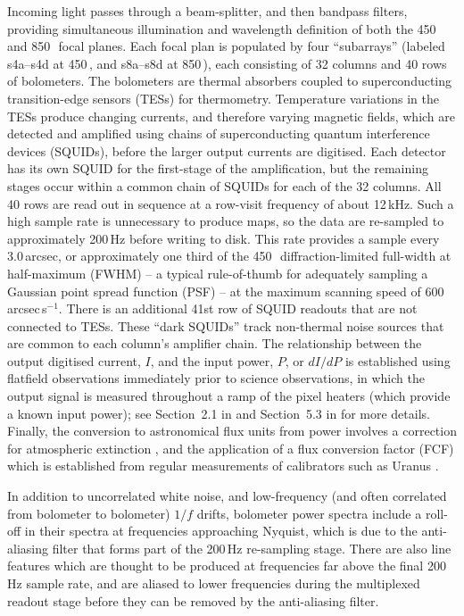 \documentclass[useAMS,usenatbib,nofootinbib]{mn2e}
\begin{document}
Incoming light passes through a beam-splitter, and then bandpass
filters, providing simultaneous illumination and wavelength definition
of both the 450 and 850\,\micron\ focal planes. Each focal plan is
populated by four ``subarrays'' (labeled s4a--s4d at 450\,\micron, and
s8a--s8d at 850\,\micron), each consisting of 32 columns and 40 rows
of bolometers. The bolometers are thermal absorbers coupled to
superconducting transition-edge sensors (TESs) for thermometry.
Temperature variations in the TESs produce changing currents, and
therefore varying magnetic fields, which are detected and amplified
using chains of superconducting quantum interference devices (SQUIDs),
before the larger output currents are digitised. Each detector has its
own SQUID for the first-stage of the amplification, but the remaining
stages occur within a common chain of SQUIDs for each of the 32
columns. All 40 rows are read out in sequence at a row-visit frequency
of about 12\,kHz. Such a high sample rate is unnecessary to produce
maps, so the data are re-sampled to approximately 200\,Hz before
writing to disk. This rate provides a sample every 3.0\,arcsec, or
approximately one third of the 450\,\micron\ diffraction-limited
full-width at half-maximum (FWHM) -- a typical rule-of-thumb for
adequately sampling a Gaussian point spread function (PSF) -- at the
maximum scanning speed of 600\,arcsec\,s$^{-1}$. There is an
additional 41st row of SQUID readouts that are not connected to
TESs. These ``dark SQUIDs'' track non-thermal noise sources that are
common to each column's amplifier chain. The relationship between the
output digitised current, $I$, and the input power, $P$, or $dI/dP$ is
established using flatfield observations immediately prior to science
observations, in which the output signal is measured throughout a ramp
of the pixel heaters (which provide a known input power); see
Section~2.1 in \citet{dempsey2012} and Section~5.3 in
\citet{holland2012} for more details. Finally, the conversion to
astronomical flux units from power involves a correction for
atmospheric extinction \citep[primarily using the JCMT Water Vapour
Monitor to track line-of-sight opacity variations, see Section~3
in][]{dempsey2012}, and the application of a flux conversion factor
(FCF) which is established from regular measurements of calibrators
such as Uranus \citep[Section~5 in][]{dempsey2012}.

In addition to uncorrelated white noise, and low-frequency (and often
correlated from bolometer to bolometer) $1/f$ drifts, bolometer power
spectra include a roll-off in their spectra at frequencies approaching
Nyquist, which is due to the anti-aliasing filter that forms part of
the 200\,Hz re-sampling stage. There are also line features which are
thought to be produced at frequencies far above the final 200\,Hz
sample rate, and are aliased to lower frequencies during the
multiplexed readout stage before they can be removed by the
anti-aliasing filter.
\end{document}
